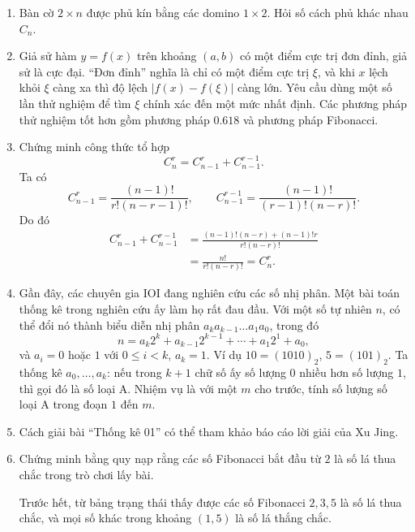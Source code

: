 \documentclass[11pt]{article}
\begin{document}
\begin{enumerate}
  \item {} Bàn cờ \(2\times n\) được phủ kín bằng các
  domino \(1\times2\). Hỏi số cách phủ khác nhau \(C_n\).

  \item {} Giả sử hàm \(y=f(x)\) trên
  khoảng \((a,b)\) có một điểm cực trị đơn đỉnh, giả sử là cực đại. ``Đơn
  đỉnh'' nghĩa là chỉ có một điểm cực trị \(\xi\), và khi \(x\) lệch khỏi
  \(\xi\) càng xa thì độ lệch \(|f(x)-f(\xi)|\) càng lớn. Yêu cầu dùng một số
  lần thử nghiệm để tìm \(\xi\) chính xác đến một mức nhất định. Các phương
  pháp thử nghiệm tốt hơn gồm phương pháp \(0.618\) và phương pháp Fibonacci.

  \item Chứng minh công thức tổ hợp
  \[
    C_n^r=C_{n-1}^r+C_{n-1}^{r-1}.
  \]
  Ta có
  \[
    C_{n-1}^r=\frac{(n-1)!}{r!(n-r-1)!},\qquad
    C_{n-1}^{r-1}=\frac{(n-1)!}{(r-1)!(n-r)!}.
  \]
  Do đó
  \[
  \begin{aligned}
    C_{n-1}^r+C_{n-1}^{r-1}
    &=
    \frac{(n-1)!(n-r)+(n-1)!r}{r!(n-r)!}\\
    &=\frac{n!}{r!(n-r)!}=C_n^r.
  \end{aligned}
  \]

  \item {} Gần đây, các chuyên gia IOI đang nghiên cứu các số
  nhị phân. Một bài toán thống kê trong nghiên cứu ấy làm họ rất đau đầu. Với
  một số tự nhiên \(n\), có thể đổi nó thành biểu diễn nhị phân
  \(a_ka_{k-1}\ldots a_1a_0\), trong đó
  \[
    n=a_k2^k+a_{k-1}2^{k-1}+\cdots+a_1 2^1+a_0,
  \]
  và \(a_i=0\) hoặc \(1\) với \(0\le i<k\), \(a_k=1\). Ví dụ
  \(10=(1010)_2\), \(5=(101)_2\). Ta thống kê \(a_0,\ldots,a_k\): nếu trong
  \(k+1\) chữ số ấy số lượng \(0\) nhiều hơn số lượng \(1\), thì gọi đó là số
  loại A. Nhiệm vụ là với một \(m\) cho trước, tính số lượng số loại A trong
  đoạn \(1\) đến \(m\).

  \item Cách giải bài ``Thống kê 01'' có thể tham khảo báo cáo lời giải của
  Xu Jing.

  \item Chứng minh bằng quy nạp rằng các số Fibonacci bắt đầu từ \(2\) là số
  lá thua chắc trong trò chơi lấy bài.

  Trước hết, từ bảng trạng thái thấy được các số Fibonacci \(2,3,5\) là số
  lá thua chắc, và mọi số khác trong khoảng \((1,5)\) là số lá thắng chắc.


\end{enumerate}
\end{document}
